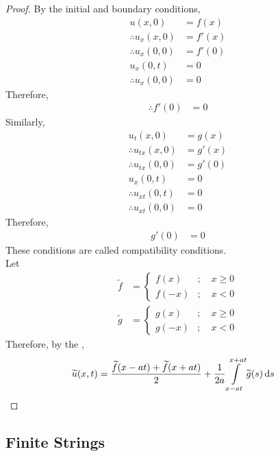 \documentclass[titlepage, fleqn, a4paper, 12pt, twoside]{article}
\theoremstyle{definition}
\theoremstyle{theorem}
\renewcommand{\tilde}{\widetilde}
\begin{document}
\begin{proof}
	By the initial and boundary conditions,
	\begin{align*}
		u(x,0) &= f(x)\\
		\therefore u_x(x,0) &= f'(x)\\
		\therefore u_x(0,0) &= f'(0)\\
		u_x(0,t) &= 0\\
		\therefore u_x(0,0) &= 0
	\end{align*}
	Therefore,
	\begin{align*}
		\therefore f'(0) &= 0
	\end{align*}
	Similarly,
	\begin{align*}
		u_t(x,0) &= g(x)\\
		\therefore u_{t x}(x,0) &= g'(x)\\
		\therefore u_{t x}(0,0) &= g'(0)\\
		u_x(0,t) &= 0\\
		\therefore u_{x t}(0,t) &= 0\\
		\therefore u_{x t}(0,0) &= 0
	\end{align*}
	Therefore,
	\begin{align*}
		g'(0) &= 0
	\end{align*}
	These conditions are called compatibility conditions.\\
	Let
	\begin{align*}
		\tilde{f} &=
			\begin{cases}
				f(x) &;\quad x \ge 0\\
				f(-x) &;\quad x < 0
			\end{cases}\\
		\tilde{g} &=
			\begin{cases}
				g(x) &;\quad x \ge 0\\
				g(-x) &;\quad x < 0
			\end{cases}
	\end{align*}
	Therefore, by the ,
	\begin{align*}
		\tilde{u}(x,t) &= \frac{\tilde{f}(x - a t) + \tilde{f}(x + a t)}{2} + \frac{1}{2 a} \int\limits_{x - a t}^{x + a t} \tilde{g}(s) \dif s
	\end{align*}
\end{proof}

\subsection{Finite Strings}
\end{document}
